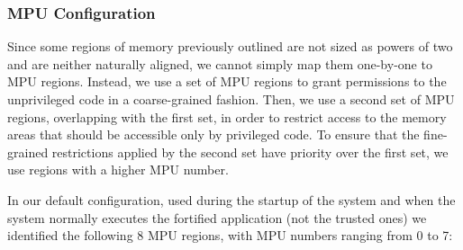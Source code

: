 \documentclass{article}
\begin{document}
\subsubsection{MPU Configuration}
\label{mpu-config}
Since some regions of memory previously outlined are not sized as powers of two and are neither naturally aligned, we cannot simply map them one-by-one to MPU regions. Instead, we use a set of MPU regions to grant permissions to the unprivileged code in a coarse-grained fashion. Then, we use a second set of MPU regions, overlapping with the first set, in order to restrict access to the memory areas that should be accessible only by privileged code. To ensure that the fine-grained restrictions applied by the second set have priority over the first set, we use regions with a higher MPU number.

In our default configuration, used during the startup of the system and when the system normally executes the fortified application (not the trusted ones) we identified the following 8 MPU regions, with MPU numbers ranging from 0 to 7:
\end{document}
